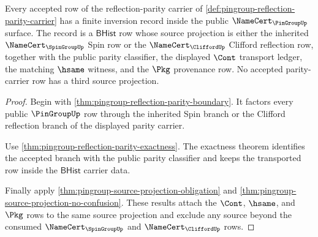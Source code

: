 \begin{theorem}
\label{thm:pingroup-parity-carrier-inversion}
Every accepted row of the reflection-parity carrier of
\autoref{def:pingroup-reflection-parity-carrier} has a finite inversion record
inside the public $\NameCert_{\PinGroupUp}$ surface. The record is a
$\mathsf{BHist}$ row whose source projection is either the inherited
$\NameCert_{\SpinGroupUp}$ Spin row or the $\NameCert_{\CliffordUp}$ Clifford
reflection row, together with the public parity classifier, the displayed
$\Cont$ transport ledger, the matching $\hsame$ witness, and the $\Pkg$
provenance row. No accepted parity-carrier row has a third source projection.
\end{theorem}
\begin{proof}
Begin with \autoref{thm:pingroup-reflection-parity-boundary}. It factors every
public $\PinGroupUp$ row through the inherited Spin branch or the Clifford
reflection branch of the displayed parity carrier.

Use \autoref{thm:pingroup-reflection-parity-exactness}. The exactness theorem
identifies the accepted branch with the public parity classifier and keeps the
transported row inside the $\mathsf{BHist}$ carrier data.

Finally apply \autoref{thm:pingroup-source-projection-obligation} and
\autoref{thm:pingroup-source-projection-no-confusion}. These results attach
the $\Cont$, $\hsame$, and $\Pkg$ rows to the same source projection and exclude
any source beyond the consumed $\NameCert_{\SpinGroupUp}$ and
$\NameCert_{\CliffordUp}$ rows.
\end{proof}

